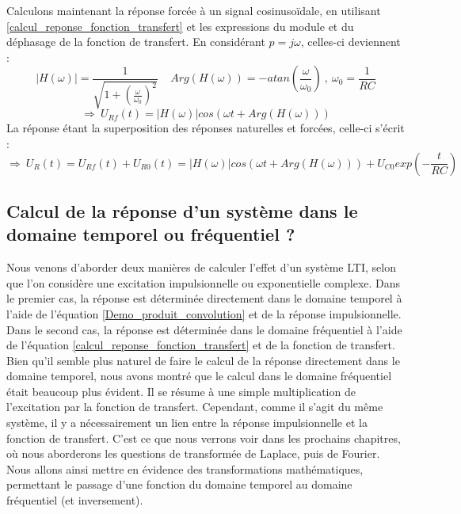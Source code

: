 \documentclass[]{report}
\begin{document}
	Calculons maintenant la réponse forcée à un signal cosinusoïdale, en utilisant \ref{calcul_reponse_fonction_transfert} et les expressions du module et du déphasage de la fonction de transfert. En considérant $p=j\omega$, celles-ci deviennent :
	\begin{equation*}
	|H(\omega)|=\frac{1}{\sqrt{1+(\frac{\omega}{\omega_{0}})^{2}}}~~~~~Arg(H(\omega))=-atan(\frac{\omega}{\omega_{0}})~,~\omega_{0}=\frac{1}{RC}
	\end{equation*}
	\begin{equation*}
	\Rightarrow~U_{Rf}(t)=|H(\omega)|cos(\omega t+Arg(H(\omega)))
	\end{equation*}
	La réponse étant la superposition des réponses naturelles et forcées, celle-ci s'écrit :
	\begin{equation*}
	\Rightarrow~U_{R}(t)=U_{Rf}(t)+U_{R0}(t)=|H(\omega)|cos(\omega t+Arg(H(\omega)))+U_{C0}exp(-\frac{t}{RC})
	\end{equation*}
	
	\vspace{1\baselineskip}

	\subsection{Calcul de la réponse d'un système dans le domaine temporel ou fréquentiel ?}
	
	Nous venons d'aborder deux manières de calculer l'effet d'un système LTI, selon que l'on considère une excitation impulsionnelle ou exponentielle complexe. Dans le premier cas, la réponse est déterminée directement dans le domaine temporel à l'aide de l'équation \ref{Demo_produit_convolution} et de la réponse impulsionnelle. Dans le second cas, la réponse est déterminée dans le domaine fréquentiel à l'aide de l'équation \ref{calcul_reponse_fonction_transfert} et de la fonction de transfert.	
	Bien qu'il semble plus naturel de faire le calcul de la réponse directement dans le domaine temporel, nous avons montré que le calcul dans le domaine fréquentiel était beaucoup plus évident. Il se résume à une simple multiplication de l'excitation par la fonction de transfert. 
	Cependant, comme il s'agit du même système, il y a nécessairement un lien entre la réponse impulsionnelle et la fonction de transfert. C'est ce que nous verrons voir dans les prochains chapitres, où nous aborderons les questions de transformée de Laplace, puis de Fourier. Nous allons ainsi mettre en évidence des transformations mathématiques, permettant le passage d'une fonction du domaine temporel au domaine fréquentiel (et inversement).
	
\end{document}
